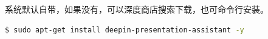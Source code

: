 \documentclass[doctor,openright,twoside]{sjtuthesis}
\theoremstyle{plain}
\theoremstyle{definition}
\theoremstyle{remark}
\theoremstyle{ocrenumbox}
\theoremstyle{plain}
\begin{document}

系统默认自带，如果没有，可以深度商店搜索下载，也可命令行安装。

\begin{lstlisting}[language=bash]
$ sudo apt-get install deepin-presentation-assistant -y
\end{lstlisting}
\end{document}

